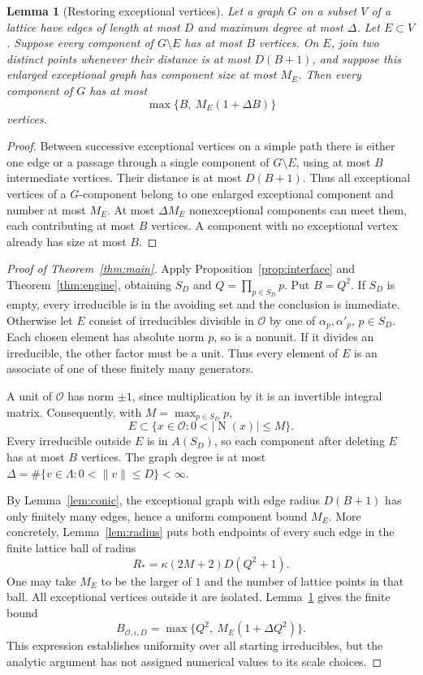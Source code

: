 \documentclass[11pt]{article}
\numberwithin{equation}{section}
\newtheorem{lemma}[theorem]{Lemma}
\theoremstyle{definition}\newtheorem{definition}[theorem]{Definition}
\theoremstyle{remark}\newtheorem{remark}[theorem]{Remark}
\newcommand{\OO}{\mathcal O}\newcommand{\PP}{\mathcal P}
\newcommand{\norm}[1]{\lVert #1\rVert}
\newcommand{\abs}[1]{\lvert #1\rvert}
\newcommand{\set}[1]{\{#1\}}
\newcommand{\N}{\operatorname{N}}
\begin{document}
\begin{lemma}[Restoring exceptional vertices]\label{lem:restoration}
Let a graph $G$ on a subset $V$ of a lattice have edges of length at most $D$ and maximum degree at most $\Delta$. Let $E\subset V$. Suppose every component of $G\setminus E$ has at most $B$ vertices. On $E$, join two distinct points whenever their distance is at most $D(B+1)$, and suppose this enlarged exceptional graph has component size at most $M_E$. Then every component of $G$ has at most
\[
 \max\{B,\ M_E(1+\Delta B)\}
\]
vertices.
\end{lemma}
\begin{proof}
Between successive exceptional vertices on a simple path there is either one edge or a passage through a single component of $G\setminus E$, using at most $B$ intermediate vertices. Their distance is at most $D(B+1)$. Thus all exceptional vertices of a $G$-component belong to one enlarged exceptional component and number at most $M_E$. At most $\Delta M_E$ nonexceptional components can meet them, each contributing at most $B$ vertices. A component with no exceptional vertex already has size at most $B$.
\end{proof}

\begin{proof}[Proof of Theorem~\ref{thm:main}]
Apply Proposition~\ref{prop:interface} and Theorem~\ref{thm:engine}, obtaining $S_D$ and $Q=\prod_{p\in S_D}p$. Put $B=Q^2$. If $S_D$ is empty, every irreducible is in the avoiding set and the conclusion is immediate. Otherwise let $E$ consist of irreducibles divisible in $\OO$ by one of $\alpha_p,\alpha'_p$, $p\in S_D$. Each chosen element has absolute norm $p$, so is a nonunit. If it divides an irreducible, the other factor must be a unit. Thus every element of $E$ is an associate of one of these finitely many generators.

A unit of $\OO$ has norm $\pm1$, since multiplication by it is an invertible integral matrix. Consequently, with $M=\max_{p\in S_D}p$,
\[
 E\subset\set{x\in\OO:0<\abs{\N(x)}\le M}.
\]
Every irreducible outside $E$ is in $A(S_D)$, so each component after deleting $E$ has at most $B$ vertices. The graph degree is at most
$\Delta=\#\set{v\in\Lambda:0<\norm v\le D}<\infty$.

By Lemma~\ref{lem:conic}, the exceptional graph with edge radius $D(B+1)$ has only finitely many edges, hence a uniform component bound $M_E$. More concretely, Lemma~\ref{lem:radius} puts both endpoints of every such edge in the finite lattice ball of radius
\[
 R_*=\kappa(2M+2)D(Q^2+1).
\]
One may take $M_E$ to be the larger of $1$ and the number of lattice points in that ball. All exceptional vertices outside it are isolated. Lemma~\ref{lem:restoration} gives the finite bound
\[
 B_{\OO,\iota,D}=\max\{Q^2,\ M_E(1+\Delta Q^2)\}.
\]
This expression establishes uniformity over all starting irreducibles, but the analytic argument has not assigned numerical values to its scale choices.
\end{proof}
\end{document}
